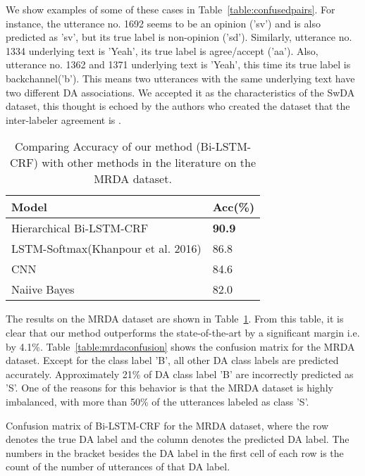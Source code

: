 \documentclass[letterpaper]{article} \usepackage{aaai18}
\begin{document}
We show examples of some of these cases in Table~\ref{table:confusedpairs}. For instance, the utterance no. 1692 seems to be an opinion ('sv') and is also predicted as 'sv', but its true label is non-opinion ('sd'). Similarly, utterance no. 1334 underlying text is 'Yeah', its true label is agree/accept ('aa'). Also, utterance no. 1362 and 1371 underlying text is 'Yeah', this time its true label is backchannel('b'). This means two utterances with the same underlying text have two different DA associations. 
We accepted it as the characteristics of the SwDA dataset, this thought is echoed by the authors who created the dataset that the inter-labeler agreement is . \begin{table}[!htb]
  \center
  \small
  \begin{tabular}{| l | l |}
    \hline
    \textbf{Model} & \textbf{Acc(\%)} \\
    \hline
    Hierarchical Bi-LSTM-CRF & \textbf{90.9} \\
LSTM-Softmax(Khanpour et al. 2016) & 86.8\\
    CNN\cite{Lee2016} & 84.6 \\
    Naiive Bayes\cite{Lendvai2007} & 82.0 \\
    \hline
  \end{tabular}
  \caption{Comparing Accuracy of our method (Bi-LSTM-CRF) with other methods in the literature on the MRDA dataset.}
  \label{table:results1}
\end{table}


The results on the MRDA dataset are shown in Table~\ref{table:results1}. From this table, it is clear that our method outperforms the state-of-the-art by a significant margin i.e. by 4.1\%. Table~\ref{table:mrdaconfusion} shows the confusion matrix for the MRDA dataset. Except for the class label 'B', all other DA class labels are predicted accurately. Approximately 21\% of DA class label 'B' are incorrectly predicted as 'S'. One of the reasons for this behavior is that the MRDA dataset is highly imbalanced, with more than 50\% of the utterances labeled as class 'S'.
\begin{table}[!htb]
  \centering
  \small
  \caption{Confusion matrix of Bi-LSTM-CRF for the MRDA dataset, where the row denotes the true DA label and the column denotes the predicted DA label. The numbers in the bracket besides the DA label in the first cell of each row is the count of the number of utterances of that DA label.}
  \label{table:mrdaconfusion}
\end{table}
\end{document}
